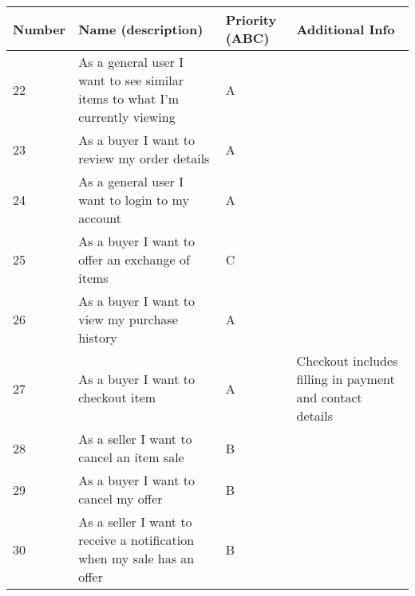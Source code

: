 \begin{tabular}{|p{1.5cm}|p{5cm}|p{1.5cm}|p{5cm}|}
\hline
\textbf{Number} & \textbf{Name (description)} & \textbf{Priority (ABC)} & \textbf{Additional Info} \\ \hline
22 & As a general user I want to see similar items to what I'm currently viewing & A & \\ \hline
23 & As a buyer I want to review my order details& A &\\ \hline
24 & As a general user I want to login to my account& A &\\ \hline
25 & As a buyer I want to offer an exchange of items& C &\\ \hline
26 & As a buyer I want to view my purchase history& A  & \\ \hline
27 & As a buyer I want to checkout item & A & Checkout includes filling in payment and contact details\\ \hline
28 & As a seller I want to cancel an item sale & B & \\ \hline
29 & As a buyer I want to cancel my offer & B & \\ \hline
30 & As a seller I want to receive a notification when my sale has an offer & B & \\ \hline
\end{tabular}
